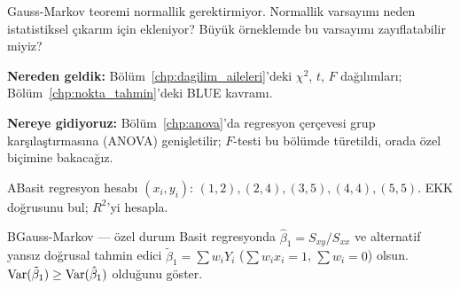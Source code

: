 \begin{ozyansima}
Gauss-Markov teoremi normallik gerektirmiyor. Normallik varsayımı neden istatistiksel çıkarım için ekleniyor? Büyük örneklemde bu varsayımı zayıflatabilir miyiz?
\end{ozyansima}

\begin{kopru}
\textbf{Nereden geldik:} Bölüm~\ref{chp:dagilim_aileleri}'deki $\chi^2$, $t$, $F$ dağılımları; Bölüm~\ref{chp:nokta_tahmin}'deki BLUE kavramı.

\textbf{Nereye gidiyoruz:} Bölüm~\ref{chp:anova}'da regresyon çerçevesi grup karşılaştırmasına (ANOVA) genişletilir; $F$-testi bu bölümde türetildi, orada özel biçimine bakacağız.
\end{kopru}


\cozumlualistirmalar

\begin{alistirma}[Al.15.1]{A}{Basit regresyon hesabı}
$(x_i,y_i)$: $(1,2),(2,4),(3,5),(4,4),(5,5)$. EKK doğrusunu bul; $R^2$'yi hesapla.
\end{alistirma}

\begin{alistirma}[Al.15.2]{B}{Gauss-Markov --- özel durum}
Basit regresyonda $\hat\beta_1=S_{xy}/S_{xx}$ ve alternatif yansız doğrusal tahmin edici $\tilde\beta_1=\sum w_i Y_i$ ($\sum w_i x_i=1$, $\sum w_i=0$) olsun. $\operatorname{Var}(\tilde\beta_1)\geq\operatorname{Var}(\hat\beta_1)$ olduğunu göster.
\end{alistirma}


